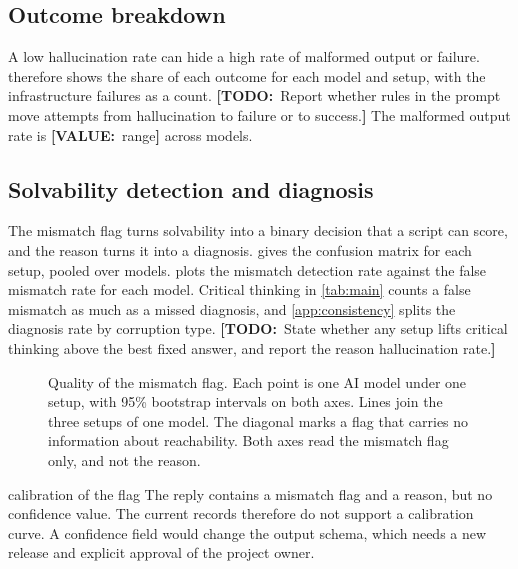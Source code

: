 \documentclass[10pt,twocolumn,letterpaper]{article}
\newcommand{\todo}[1]{{\color{red!70!black}\textbf{[TODO:}~#1\textbf{]}}}
\newcommand{\val}[1]{{\color{red!70!black}\textbf{[VALUE:}~#1\textbf{]}}}
\begin{document}
\subsection{Outcome breakdown}\label{sec:res-outcomes}
A low hallucination rate can hide a high rate of malformed output or failure.  therefore shows the share of each outcome for each model and setup, with the infrastructure failures as a count. \todo{Report whether rules in the prompt move attempts from hallucination to failure or to success.} The malformed output rate is \val{range} across models.


\subsection{Solvability detection and diagnosis}\label{sec:res-detection}
The mismatch flag turns solvability into a binary decision that a script can score, and the reason turns it into a diagnosis.  gives the confusion matrix for each setup, pooled over models.  plots the mismatch detection rate against the false mismatch rate for each model. Critical thinking in \cref{tab:main} counts a false mismatch as much as a missed diagnosis, and \cref{app:consistency} splits the diagnosis rate by corruption type. \todo{State whether any setup lifts critical thinking above the best fixed answer, and report the reason hallucination rate.}


\begin{figure}[!htbp]
\caption{Quality of the mismatch flag. Each point is one AI model under one setup, with 95\% bootstrap intervals on both axes. Lines join the three setups of one model. The diagonal marks a flag that carries no information about reachability. Both axes read the mismatch flag only, and not the reason.}
\label{fig:flag-roc}
\end{figure}

\begin{uncertainty}{calibration of the flag}
The reply contains a mismatch flag and a reason, but no confidence value. The current records therefore do not support a calibration curve. A confidence field would change the output schema, which needs a new release and explicit approval of the project owner.
\end{uncertainty}
\end{document}
